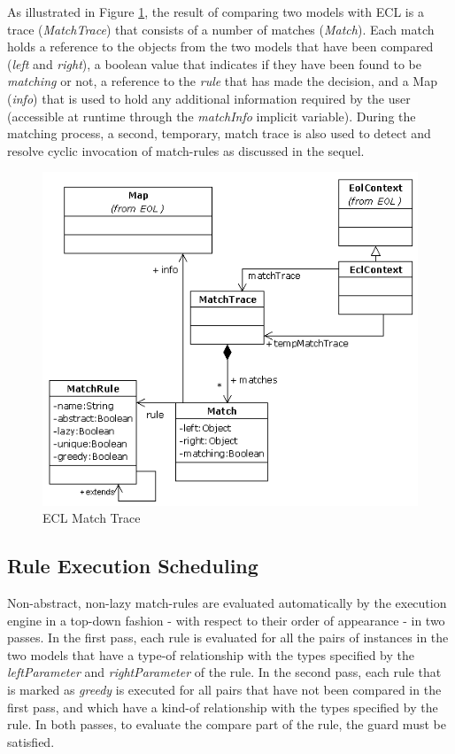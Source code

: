 As illustrated in Figure \ref{fig:ECLRuntime}, the result of comparing two models with ECL is a trace (\emph{MatchTrace}) that consists of a number of matches (\emph{Match}). Each match holds a reference to the objects from the two models that have been compared (\emph{left} and \emph{right}), a boolean value that indicates if they have been found to be \emph{matching} or not, a reference to the \emph{rule} that has made the decision, and a Map (\emph{info}) that is used to hold any additional information required by the user (accessible at runtime through the \emph{matchInfo} implicit variable). During the matching process, a second, temporary, match trace is also used to detect and resolve cyclic invocation of match-rules as discussed in the sequel.

\begin{figure}
	\centering
		\includegraphics{images/ECLRuntime.png}
	\caption{ECL Match Trace}
	\label{fig:ECLRuntime}
\end{figure}

\subsection{Rule Execution Scheduling}

Non-abstract, non-lazy match-rules are evaluated automatically by the execution engine in a top-down fashion - with respect to their order of appearance - in two passes. In the first pass, each rule is evaluated for all the pairs of instances in the two models that have a type-of relationship with the types specified by the \emph{leftParameter} and \emph{rightParameter} of the rule. In the second pass, each rule that is marked as \emph{greedy} is executed for all pairs that have not been compared in the first pass, and which have a kind-of relationship with the types specified by the rule. In both passes, to evaluate the compare part of the rule, the guard must be satisfied.

